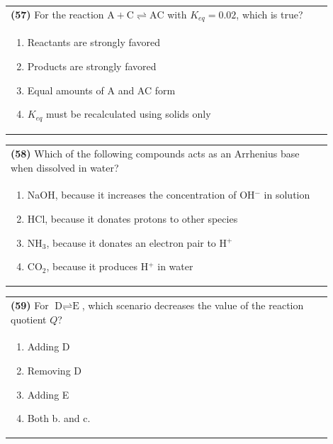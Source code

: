 \documentclass{article}
\begin{document}
\noindent\begin{tabular}{|p{0.9\linewidth}|}
\hline
\textbf{(57)} For the reaction $\text{A} + \text{C} \rightleftharpoons \text{AC}$ with $K_{eq} = 0.02$, which is true?\\[0.2cm]
\begin{minipage}[t]{0.85\linewidth}
\begin{enumerate}[label=\alph*.]
\item Reactants are strongly favored
\item Products are strongly favored
\item Equal amounts of A and AC form
\item $K_{eq}$ must be recalculated using solids only
\end{enumerate}
\end{minipage}\\[0.2cm]
\hline
\end{tabular}

\noindent\begin{tabular}{|p{0.9\linewidth}|}
\hline
\textbf{(58)} Which of the following compounds acts as an Arrhenius base when dissolved in water?\\[0.2cm]
\begin{minipage}[t]{0.85\linewidth}
\begin{enumerate}[label=\alph*.]
\item NaOH, because it increases the concentration of OH$^-$ in solution
\item HCl, because it donates protons to other species
\item NH$_3$, because it donates an electron pair to H$^+$
\item CO$_2$, because it produces H$^+$ in water
\end{enumerate}
\end{minipage}\\[0.2cm]
\hline
\end{tabular}


\noindent\begin{tabular}{|p{0.9\linewidth}|}
\hline
\textbf{(59)} For $\text{D} \rightleftharpoons \text{E}$, which scenario decreases the value of the reaction quotient $Q$?\\[0.2cm]
\begin{minipage}[t]{0.85\linewidth}
\begin{enumerate}[label=\alph*.]
\item Adding D
\item Removing D
\item Adding E
\item Both b. and c.
\end{enumerate}
\end{minipage}\\[0.2cm]
\hline
\end{tabular}
\end{document}
